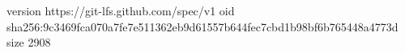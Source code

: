version https://git-lfs.github.com/spec/v1
oid sha256:9c3469fca070a7fe7e511362eb9d61557b644fec7cbd1b98bf6b765448a4773d
size 2908
